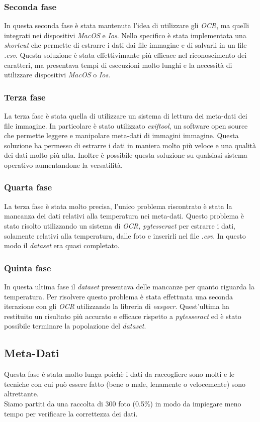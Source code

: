 \documentclass[12pt,a4paper,twoside]{article}
\begin{document}
\subsubsection{Seconda fase}
In questa seconda fase è stata mantenuta l'idea di utilizzare gli \textit{OCR}, ma quelli integrati nei 
dispositivi \textit{MacOS} e \textit{Ios}. Nello specifico è stata implementata una \textit{shortcut} che 
permette di estrarre i dati dai file immagine e di salvarli in un file \textit{.csv}. Questa soluzione è 
stata effettivimante più efficace nel riconoscimento dei caratteri, ma presentava tempi di esecuzioni molto 
lunghi e la necessità di utilizzare dispositivi \textit{MacOS} o \textit{Ios}.

\subsubsection{Terza fase}
La terza fase è stata quella di utilizzare un sistema di lettura dei meta-dati dei file immagine. In 
particolare è stato utilizzato \textit{exiftool}, un software open source che permette leggere e 
manipolare meta-dati di immagini immagine. Questa soluzione ha permesso di estrarre i dati in maniera molto 
più veloce e una qualità dei dati molto più alta. Inoltre è possibile questa soluzione su qualsiasi sistema 
operativo aumentandone la versatilità.
\subsubsection{Quarta fase}
La terza fase è stata molto precisa, l'unico problema riscontrato è stata la mancanza dei dati relativi 
alla temperatura nei meta-dati. Questo problema è stato risolto utilizzando un sistema di 
\textit{OCR, pytesseract} per estrarre i dati, solamente relativi alla temperatura, dalle foto e inserirli 
nel file \textit{.csv}. In questo modo il \textit{dataset} era quasi completato.
\subsubsection{Quinta fase}
In questa ultima fase il \textit{dataset} presentava delle mancanze per quanto riguarda la temperatura. Per 
risolvere questo problema è stata effettuata una seconda iterazione con gli \textit{OCR} utilizzando la 
libreria di \textit{easyocr}. Quest'ultima ha restituito un risultato più accurato e efficace rispetto a 
\textit{pytesseract} ed è stato possibile terminare la popolazione del \textit{dataset}.

\subsection{Meta-Dati}
Questa fase è stata molto lunga poichè i dati da raccogliere sono molti e le tecniche con cui può essere fatto 
(bene o male, lenamente o velocemente) sono altrettante.\\
Siamo partiti da una raccolta di 300 foto (0.5\%) in modo da impiegare meno tempo per verificare la correttezza 
dei dati.
\end{document}

